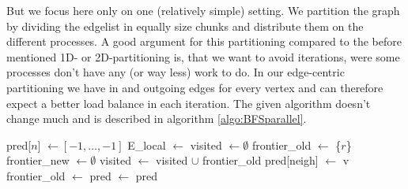 But we focus here only on one (relatively simple) setting. We partition the graph by dividing the edgelist in equally size chunks and distribute them on the different processes.
A good argument for this partitioning compared to the before mentioned 1D- or 2D-partitioning is, that we want to avoid iterations, were some processes don't have any (or way less) work to do.
In our edge-centric partitioning we have in and outgoing edges for every vertex and can therefore expect a better load balance in each iteration. The given algorithm doesn't change much and is described in algorithm \ref{algo:BFSparallel}.

\begin{algorithm} [h]
	\caption{Our parallel implementation of BFS\\
	$n$: number of vertices\\
	$E$: set of edges\\
	$r$: root node}	
	\label{algo:BFSparallel}
	\begin{algorithmic}[1]
		\State pred[$n$] $\gets [-1, \dots, -1]$
		\State E\_local $\gets$  
		\State visited $\gets \emptyset$ 
		\State frontier\_old $\gets$ \{$r$\}
			\State frontier\_new $\gets \emptyset$
			\State visited $\gets$ visited $\cup$ frontier\_old
						\State pred[neigh] $\gets$ v
						\State {}
					\EndIf
				\EndFor
			\EndFor
			\State frontier\_old $\gets$ 
		\EndWhile
		\State pred $\gets$ 
		\State \Return pred
		\EndProcedure
	\end{algorithmic}
\end{algorithm}

